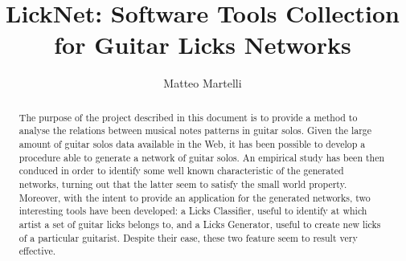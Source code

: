 \documentclass{llncs}
\title{LickNet: Software Tools Collection for Guitar Licks Networks}
\author{Matteo Martelli}
\institute{
	University of Bologna\\ 
	\email{matteo.martelli9@studio.unibo.it}
}
\begin{document}
\maketitle

\begin{abstract}
The purpose of the project described in this document is to provide a
method to analyse the relations between musical notes patterns 
in guitar solos.
Given the large amount of guitar solos data available in the Web, it has been possible to
 develop a procedure able to generate a network of guitar solos.
An empirical study has been then conduced in
order to identify some well known characteristic of the generated
networks, turning out that the latter seem to satisfy the small world
property\cite{sw-watts}. Moreover, with the intent to provide an application
for the generated networks, two interesting tools have been developed:
a Licks Classifier, useful to identify at which artist a set of
guitar licks belongs to, and a Licks Generator, useful to create new
licks of a particular guitarist. Despite their ease, these two feature
seem to result very effective.
\end{abstract}
\end{document}
